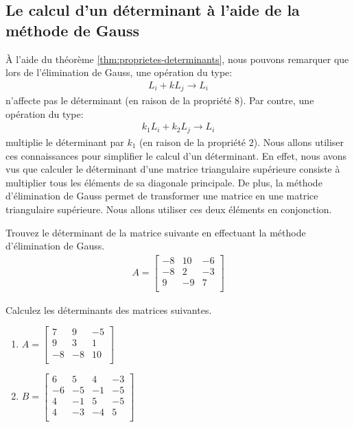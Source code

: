 \documentclass[]{book}
\providecommand{\tightlist}{%
  \setlength{\itemsep}{0pt}\setlength{\parskip}{0pt}}
\theoremstyle{definition}
\theoremstyle{definition}
\theoremstyle{definition}
\theoremstyle{remark}
\let\BeginKnitrBlock\begin \let\EndKnitrBlock\end
\begin{document}
\hypertarget{le-calcul-dun-duxe9terminant-uxe0-laide-de-la-muxe9thode-de-gauss}{%
\subsection{Le calcul d'un déterminant à l'aide de la méthode de Gauss}\label{le-calcul-dun-duxe9terminant-uxe0-laide-de-la-muxe9thode-de-gauss}}

À l'aide du théorème \ref{thm:proprietes-determinants}, nous pouvons remarquer que lors de l'élimination de Gauss, une opération du type:
\begin{align*}
    L_i + kL_j \rightarrow L_i 
\end{align*}
n'affecte pas le déterminant (en raison de la propriété \(8\)). Par contre, une opération du type:
\begin{align*}
    k_1L_i + k_2L_j \rightarrow L_i 
\end{align*}
multiplie le déterminant par \(k_1\) (en raison de la propriété \(2\)). Nous allons utiliser ces connaissances pour simplifier le calcul d'un déterminant. En effet, nous avons vus que calculer le déterminant d'une matrice triangulaire supérieure consiste à multiplier tous les éléments de sa diagonale principale. De plus, la méthode d'élimination de Gauss permet de transformer une matrice en une matrice triangulaire supérieure. Nous allons utiliser ces deux éléments en conjonction.

\BeginKnitrBlock{example}
\protect\hypertarget{exm:unnamed-chunk-107}{}{\label{exm:unnamed-chunk-107} }Trouvez le déterminant de la matrice suivante en effectuant la méthode d'élimination de Gauss.
\begin{align*}
A=\begin{bmatrix}
-8&10&-6\\
-8&2&-3\\
9&-9&7\\
\end{bmatrix}
\end{align*}
\EndKnitrBlock{example}

\BeginKnitrBlock{example}
\protect\hypertarget{exm:unnamed-chunk-108}{}{\label{exm:unnamed-chunk-108} }Calculez les déterminants des matrices suivantes.

\begin{enumerate}
\def\labelenumi{\alph{enumi}.}
\tightlist
\item
  \(A=\begin{bmatrix} 7&9&-5\\ 9&3&1\\ -8&-8&10\\ \end{bmatrix}\)
\item
  \(B=\begin{bmatrix} 6&5&4&-3\\ -6&-5&-1&-5\\ 4&-1&5&-5\\ 4&-3&-4&5\\ \end{bmatrix}\)
\end{enumerate}
\EndKnitrBlock{example}
\end{document}
